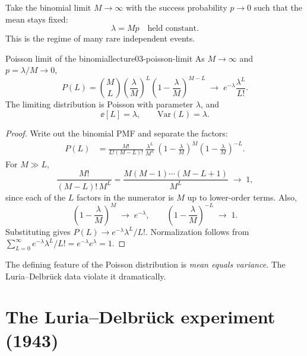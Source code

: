 Take the binomial limit $M\to\infty$ with the success probability $p\to0$ such that the mean stays fixed:
\begin{equation}\label{eq:lecture03-lambda-def}
\lambda = M p \quad\text{held constant}.
\end{equation}
This is the regime of many rare independent events.

\begin{proposition}{Poisson limit of the binomial}{lecture03-poisson-limit}
As $M\to\infty$ and $p=\lambda/M\to0$,
\begin{equation}\label{eq:lecture03-poisson-pmf}
P(L) = \binom{M}{L}\left(\frac{\lambda}{M}\right)^{L}
\left(1-\frac{\lambda}{M}\right)^{M-L}
\;\longrightarrow\;
e^{-\lambda}\frac{\lambda^{L}}{L!}.
\end{equation}
The limiting distribution is Poisson with parameter $\lambda$, and
\begin{equation}\label{eq:lecture03-poisson-moments}
\ee[L]=\lambda,\qquad \mathrm{Var}(L)=\lambda.
\end{equation}
\end{proposition}

\begin{proof}
Write out the binomial PMF and separate the factors:
\begin{align}
P(L)
&= \frac{M!}{L!(M-L)!}\,
\frac{\lambda^{L}}{M^{L}}\,
\left(1-\frac{\lambda}{M}\right)^{M}
\left(1-\frac{\lambda}{M}\right)^{-L} .
\end{align}
For $M\gg L$,
\begin{equation}\label{eq:lecture03-falling-factorial}
\frac{M!}{(M-L)!\,M^{L}}
= \frac{M(M-1)\cdots(M-L+1)}{M^{L}}
\;\longrightarrow\; 1 ,
\end{equation}
since each of the $L$ factors in the numerator is $M$ up to lower-order terms. Also,
\begin{equation}\label{eq:lecture03-exp-limit}
\left(1-\frac{\lambda}{M}\right)^{M}
\;\longrightarrow\; e^{-\lambda},
\qquad
\left(1-\frac{\lambda}{M}\right)^{-L}
\;\longrightarrow\; 1 .
\end{equation}
Substituting gives $P(L)\to e^{-\lambda}\lambda^{L}/L!$. Normalization follows from $\sum_{L=0}^{\infty}e^{-\lambda}\lambda^{L}/L! = e^{-\lambda}e^{\lambda}=1$.
\end{proof}

The defining feature of the Poisson distribution is \emph{mean equals variance}. The Luria--Delbr{\"u}ck data violate it dramatically.

\section{The Luria--Delbr{\"u}ck experiment (1943)}\label{sec:lecture03-ld}


